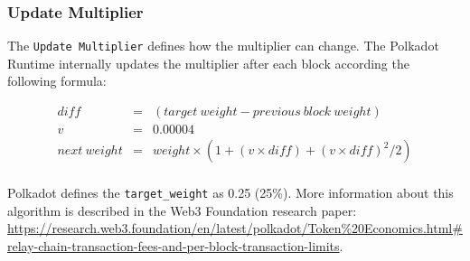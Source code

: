 \documentclass[11pt,a4paper]{article}
\begin{document}
\subsubsection{Update Multiplier}
The \verb|Update Multiplier| defines how the multiplier can change. The Polkadot Runtime internally
updates the multiplier after each block according the following formula:

\begin{eqnarray*}
diff &=& (target\ weight - previous\ block\ weight)\\
v &=& 0.00004\\
next\ weight &=& weight \times (1 + (v \times diff) + (v \times diff)^2 / 2)\\
\end{eqnarray*}

Polkadot defines the \verb|target_weight| as 0.25 (25\%). More information about this algorithm is described
in the Web3 Foundation research paper: \url{https://research.web3.foundation/en/latest/polkadot/Token%20Economics.html#relay-chain-transaction-fees-and-per-block-transaction-limits}.
\end{document}
